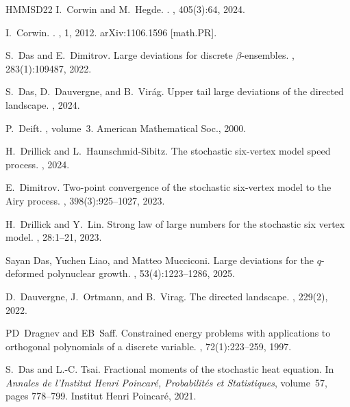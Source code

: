 \documentclass[reqno,11pt]{amsart}
\numberwithin{equation}{section}
\theoremstyle{definition}
\begin{document}
\begin{thebibliography}{HMMSD22}
I.~Corwin and M.~Hegde.
.
, 405(3):64, 2024.

I.~Corwin.
.
, 1, 2012.
\newblock arXiv:1106.1596 [math.PR].

S.~Das and E.~Dimitrov.
\newblock Large deviations for discrete $\beta$-ensembles.
, 283(1):109487, 2022.

S.~Das, D.~Dauvergne, and B.~Vir{\'a}g.
\newblock Upper tail large deviations of the directed landscape.
, 2024.

P.~Deift.
, volume~3.
\newblock American Mathematical Soc., 2000.

H.~Drillick and L.~Haunschmid-Sibitz.
\newblock The stochastic six-vertex model speed process.
, 2024.

E.~Dimitrov.
\newblock Two-point convergence of the stochastic six-vertex model to the {Airy} process.
, 398(3):925--1027, 2023.

H.~Drillick and Y.~Lin.
\newblock Strong law of large numbers for the stochastic six vertex model.
, 28:1--21, 2023.

Sayan Das, Yuchen Liao, and Matteo Mucciconi.
\newblock Large deviations for the {{\(q\)}}-deformed polynuclear growth.
, 53(4):1223--1286, 2025.

D.~Dauvergne, J.~Ortmann, and B.~Virag.
\newblock The directed landscape.
, 229(2), 2022.

PD~Dragnev and EB~Saff.
\newblock Constrained energy problems with applications to orthogonal polynomials of a discrete variable.
, 72(1):223--259, 1997.

S.~Das and L.-C. Tsai.
\newblock Fractional moments of the stochastic heat equation.
\newblock In {\em Annales de l'Institut Henri Poincar{\'e}, Probabilit{\'e}s et Statistiques}, volume~57, pages 778--799. Institut Henri Poincar{\'e}, 2021.


\end{thebibliography}
\end{document}
